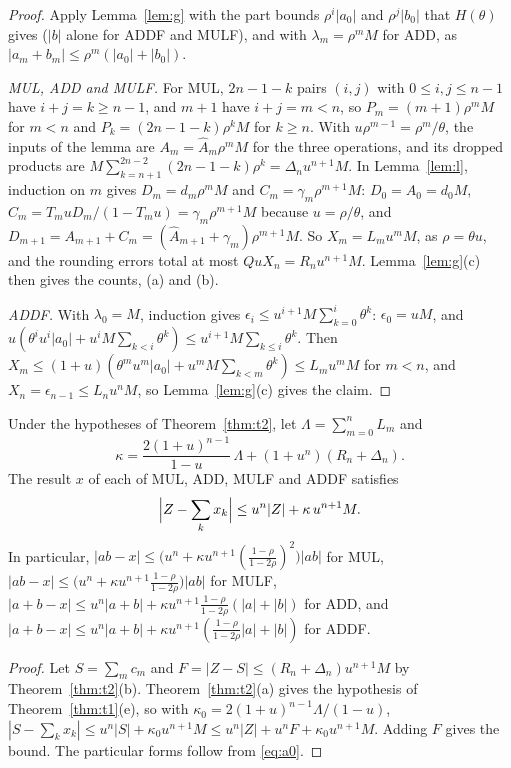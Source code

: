 \begin{proof}
Apply Lemma~\ref{lem:g} with the part bounds $\rho^i|a_0|$ and $\rho^j|b_0|$ that $H(\theta)$ gives ($|b|$ alone for
ADDF and MULF), and with $\lambda_m = \rho^mM$ for ADD, as $|a_m + b_m| \le \rho^m(|a_0| + |b_0|)$.

\emph{MUL, ADD and MULF.} For MUL, $2n-1-k$ pairs $(i, j)$ with $0 \le i, j \le n-1$ have $i + j = k \ge n-1$, and
$m+1$ have $i + j = m < n$, so $P_m = (m+1)\rho^mM$ for $m < n$ and $P_k = (2n-1-k)\rho^kM$ for $k \ge n$. With
$u\rho^{m-1} = \rho^m/\theta$, the inputs of the lemma are $A_m = \hat A_m\rho^mM$ for the three operations, and its
dropped products are $M\sum_{k=n+1}^{2n-2}(2n-1-k)\rho^k = \Delta_nu^{n+1}M$. In Lemma~\ref{lem:l}, induction on $m$
gives $D_m = d_m\rho^mM$ and $C_m = \gamma_m\rho^{m+1}M$: $D_0 = A_0 = d_0M$, $C_m = T_m u D_m/(1-T_m u) =
\gamma_m\rho^{m+1}M$ because $u = \rho/\theta$, and $D_{m+1} = A_{m+1} + C_m = (\hat A_{m+1} + \gamma_m)\rho^{m+1}M$.
So $X_m = L_m u^mM$, as $\rho = \theta u$, and the rounding errors total at most $QuX_n = R_nu^{n+1}M$.
Lemma~\ref{lem:g}(c) then gives the counts, (a) and (b).

\emph{ADDF.} With $\lambda_0 = M$, induction gives $\epsilon_i \le u^{i+1}M\sum_{k=0}^{i}\theta^k$: $\epsilon_0 = uM$,
and $u(\theta^iu^i|a_0| + u^iM\sum_{k<i}\theta^k) \le u^{i+1}M\sum_{k \le i}\theta^k$. Then $X_m \le
(1+u)(\theta^mu^m|a_0| + u^mM\sum_{k<m}\theta^k) \le L_mu^mM$ for $m < n$, and $X_n = \epsilon_{n-1} \le L_nu^nM$, so
Lemma~\ref{lem:g}(c) gives the claim.
\end{proof}


\begin{theorem}\label{thm:t3}
Under the hypotheses of Theorem~\ref{thm:t2}, let $\Lambda = \sum_{m=0}^n L_m$ and
\[
\kappa = \frac{2(1+u)^{n-1}}{1-u}\,\Lambda + (1 + u^n)(R_n + \Delta_n).
\]
The result $x$ of each of MUL, ADD, MULF and ADDF satisfies
\[
\Bigl|Z - \sum_k x_k\Bigr| \le u^n|Z| + \kappa\,u^{n+1}M.
\]
In particular,
$|ab - x| \le \bigl(u^n + \kappa u^{n+1}(\tfrac{1-\rho}{1-2\rho})^2\bigr)|ab|$ for MUL,
$|ab - x| \le \bigl(u^n + \kappa u^{n+1}\tfrac{1-\rho}{1-2\rho}\bigr)|ab|$ for MULF,
$|a + b - x| \le u^n|a+b| + \kappa u^{n+1}\tfrac{1-\rho}{1-2\rho}(|a| + |b|)$ for ADD, and
$|a + b - x| \le u^n|a+b| + \kappa u^{n+1}(\tfrac{1-\rho}{1-2\rho}|a| + |b|)$ for ADDF.
\end{theorem}

\begin{proof}
Let $S = \sum_m c_m$ and $F = |Z - S| \le (R_n + \Delta_n)u^{n+1}M$ by Theorem~\ref{thm:t2}(b). Theorem~\ref{thm:t2}(a)
gives the hypothesis of Theorem~\ref{thm:t1}(e), so with $\kappa_0 = 2(1+u)^{n-1}\Lambda/(1-u)$, $|S - \sum_k x_k| \le u^n|S| + \kappa_0u^{n+1}M \le u^n|Z|
+ u^nF + \kappa_0u^{n+1}M$. Adding $F$ gives the bound. The particular forms follow from \eqref{eq:a0}.
\end{proof}

